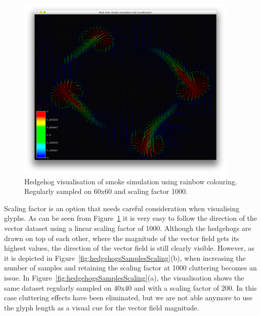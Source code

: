 \begin{figure}[htbp]
\begin{center}
 \includegraphics[height=3.5in]{figures/glyph/hedgehogsRainbow.png}
\caption{Hedgehog visualisation of smoke simulation using rainbow colouring. Regularly sampled on 60x60 and scaling factor 1000.}
\label{fig:hedgehogs}
\end{center}
\end{figure}

Scaling factor is an option that needs careful consideration when visualising glyphs. As can be seen from Figure~\ref{fig:hedgehogs} it is very easy to follow the direction of the vector dataset using a linear scaling factor of 1000. Although the hedgehogs are drawn on top of each other, where the magnitude of the vector field gets its highest values, the direction of the vector field is still clearly visible. However, as it is depicted in Figure~\ref{fig:hedgehogsSamplesScaling}(b), when increasing the number of samples and retaining the scaling factor at 1000 cluttering becomes an issue. In Figure~\ref{fig:hedgehogsSamplesScaling}(a), the visualisation shows the same dataset regularly sampled on 40x40 and with a scaling factor of 200. In this case cluttering effects have been eliminated, but we are not able anymore to use the glyph length as a visual cue for the vector field magnitude.

